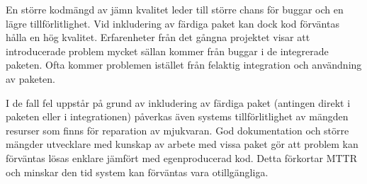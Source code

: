 En större kodmängd av jämn kvalitet leder till större chans för buggar och en lägre tillförlitlighet. Vid inkludering av färdiga paket kan dock kod förväntas hålla en hög kvalitet. Erfarenheter från det gångna projektet visar att introducerade problem mycket sällan kommer från buggar i de integrerade paketen. Ofta kommer problemen istället från felaktig integration och användning av paketen.

I de fall fel uppstår på grund av inkludering av färdiga paket (antingen direkt i paketen eller i integrationen) påverkas även systems tillförlitlighet av mängden resurser som finns för reparation av mjukvaran. God dokumentation och större mängder utvecklare med kunskap av arbete med vissa paket gör att problem kan förväntas lösas enklare jämfört med egenproducerad kod. Detta förkortar MTTR och minskar den tid system kan förväntas vara otillgängliga.
